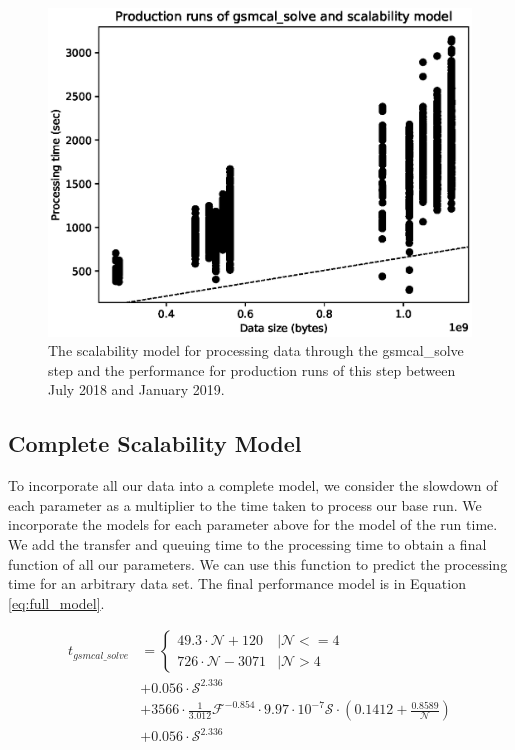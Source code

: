 \documentclass[preprint,5p]{elsarticle}
\begin{document}
\begin{figure}
    \includegraphics[width=0.95\linewidth]{figures/gsmcal_solve_size_prod.eps}
      \caption{The scalability model for processing data through the gsmcal\_solve step and the performance for production runs of this step between July 2018 and January 2019. }
	\label{fig:prod_gsmcal_times}
\end{figure}


\subsection{Complete Scalability Model}
To incorporate all our data into a complete model, we consider the slowdown of each parameter as a multiplier to the time taken to process our base run. We incorporate the models for each parameter above for the model of the run time. We add the transfer and queuing time to the processing time to obtain a final function of all our parameters. We can use this function to predict the processing time for an arbitrary data set. The final performance model is in Equation \ref{eq:full_model}. 

\begin{equ*}[!t]
\normalsize
\begin{equation}
    \begin{split}
   t_{gsmcal\_solve} & = \begin{cases}
        49.3\cdot\mathcal{N}+ 120 &|\mathcal{N}<=4\\
        726\cdot\mathcal{N}-3071 & |\mathcal{N}>4
       \end{cases} \\
       & + 0.056\cdot \mathcal{S}^{2.336} \\ 
       & + 3566\cdot \frac{1}{3.012}\mathcal{F}^{-0.854} \cdot 9.97\cdot10^{-7}\mathcal{S}\cdot (0.1412+\frac{0.8589}{\mathcal{N}}) \\
       & + 0.056\cdot \mathcal{S}^{2.336} 
       \end{split}
 \label{eq:full_model}
 \end{equation}
\caption{Model of the total time of the gsmcal\_solve step ($t_{gsmcal\_solve}$) for the parameters $\mathcal{N}$, Number of CPUs; $\mathcal{S}$, Size of data in bytes and $\mathcal{F}$, cutoff calibration model flux in Jansky. }
\end{equ*}
\end{document}
